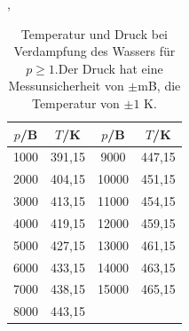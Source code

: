 \begin{table}
  \centering
  \caption{Temperatur und Druck bei Verdampfung des Wassers für $p\geq 1$.Der Druck hat eine Messunsicherheit von
  $\pm$mB, die Temperatur von $\pm 1$ K.},
  \label{tab:Messreihe_2}
\begin{tabular}{
  c c||c c
}
\toprule 
$p$/B & $T$/K & $p$/B & $T$/K\\
\midrule
1000  & 391,15 & 9000  & 447,15\\
2000  & 404,15 & 10000 & 451,15\\
3000  & 413,15 & 11000 & 454,15\\
4000  & 419,15 & 12000 & 459,15\\
5000  & 427,15 & 13000 & 461,15\\
6000  & 433,15 & 14000 & 463,15\\
7000  & 438,15 & 15000 & 465,15\\
8000  & 443,15 &       &       \\
\bottomrule
\end{tabular}
\end{table}

